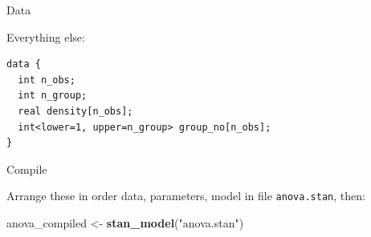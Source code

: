 \documentclass[
  ignorenonframetext,
]{beamer}
\newenvironment{Shaded}{\begin{snugshade}}{\end{snugshade}}
\newcommand{\KeywordTok}[1]{\textcolor[rgb]{0.13,0.29,0.53}{\textbf{#1}}}
\newcommand{\NormalTok}[1]{#1}
\newcommand{\StringTok}[1]{\textcolor[rgb]{0.31,0.60,0.02}{#1}}
\begin{document}
\begin{frame}[fragile]{Data}
\protect\hypertarget{data}{}

Everything else:

\begin{verbatim}
data {
  int n_obs;
  int n_group;
  real density[n_obs];
  int<lower=1, upper=n_group> group_no[n_obs];
}
\end{verbatim}

\end{frame}

\begin{frame}[fragile]{Compile}
\protect\hypertarget{compile}{}

Arrange these in order data, parameters, model in file
\texttt{anova.stan}, then:

\begin{Shaded}
\begin{Highlighting}[]
\NormalTok{anova_compiled <-}\StringTok{ }\KeywordTok{stan_model}\NormalTok{(}\StringTok{"anova.stan"}\NormalTok{)}
\end{Highlighting}
\end{Shaded}

\end{frame}
\end{document}
